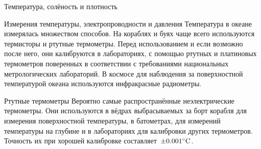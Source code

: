 \begin{chapter}{Температура, солёность и плотность}
\begin{section}{Измерения температуры, электропроводности и давления}
Температура в океане измерялась множеством способов. На кораблях и
буях чаще всего используются термисторы и ртутные термометры. Перед
использованием и если возможно после него, они калибруются в
лабораториях, с помощью ртутных и платиновых термометров поверенных в
соответствии с требованиями национальных метрологических
лабораторий. В космосе для наблюдения за поверхностной температурой
океана используются инфракрасные радиометры.
%

\begin{paragraph}{Ртутные термометры} 
Вероятно самые распространённые неэлектрические термометры. Они
используются в вёдрах выбрасываемых за борт корабля для измерения
поверхностной температуры, в батометрах, для измерений температуры на
глубине и в лабораториях для калибровки других термометров. Точность
их при хорошей калибровке составляет~$\pm{0.001}^\circ\mbox{C}$.
%





\end{paragraph}
\end{section}
\end{chapter}

